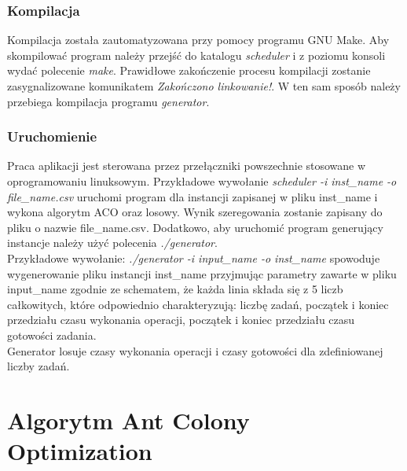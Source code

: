 \documentclass[10pt,a4paper]{article}
\begin{document}
\subsubsection{Kompilacja}
Kompilacja została zautomatyzowana przy pomocy programu GNU Make. Aby
skompilować program należy przejść do katalogu \textit{scheduler} i z poziomu 
konsoli wydać polecenie \textit{make}. Prawidłowe zakończenie procesu kompilacji 
zostanie zasygnalizowane komunikatem \textit{Zakończono linkowanie!}. W ten sam
sposób należy przebiega kompilacja programu \textit{generator}.

\subsubsection{Uruchomienie}
Praca aplikacji jest sterowana przez przełączniki powszechnie stosowane w
oprogramowaniu linuksowym.  Przykładowe wywołanie \textit{scheduler -i
inst\_name -o file\_name.csv} uruchomi program dla instancji zapisanej w pliku
inst\_name i wykona algorytm ACO oraz losowy. Wynik szeregowania zostanie
zapisany do pliku o nazwie file\_name.csv.  Dodatkowo, aby uruchomić program
generujący instancje należy użyć polecenia \textit{./generator}.\\ Przykładowe wywołanie:
\textit{./generator -i input\_name -o inst\_name } spowoduje wygenerowanie pliku
instancji inst\_name przyjmując parametry zawarte w pliku input\_name zgodnie ze
schematem, że każda linia składa się z 5 liczb całkowitych, które odpowiednio
charakteryzują: liczbę zadań, początek i koniec przedziału czasu wykonania
operacji, początek i koniec przedziału czasu gotowości zadania.\\ Generator
losuje czasy wykonania operacji i czasy gotowości dla zdefiniowanej liczby
zadań.

\section{Algorytm Ant Colony Optimization}
\end{document}
